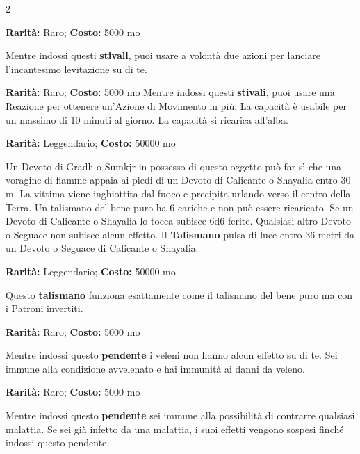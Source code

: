 \begin{multicols}{2}

\textbf{Rarità:} Raro; \textbf{Costo:} 5000 mo

Mentre indossi questi \textbf{stivali}, puoi usare a volontà due azioni per lanciare l'incantesimo levitazione su di te.


\textbf{Rarità:} Raro; \textbf{Costo:} 5000 mo
Mentre indossi questi \textbf{stivali}, puoi usare una Reazione per ottenere un'Azione di Movimento in più. La capacità è usabile per un massimo di 10 minuti al giorno. La capacità si ricarica all'alba.


\textbf{Rarità:} Leggendario; \textbf{Costo:} 50000 mo

Un Devoto di Gradh o Sumkjr in possesso di questo oggetto può far sì che una voragine di fiamme appaia ai piedi di un Devoto di Calicante o Shayalia entro 30 m. La vittima viene inghiottita dal fuoco e precipita urlando verso il centro della Terra. Un talismano del bene puro ha 6 cariche e non può essere ricaricato. Se un Devoto di Calicante o Shayalia lo tocca subisce 6d6 ferite. Qualsiasi altro Devoto o Seguace non subisce alcun effetto. Il \textbf{Talismano} pulsa di luce entro 36 metri da un Devoto o Seguace di Calicante o Shayalia.


\textbf{Rarità:} Leggendario; \textbf{Costo:} 50000 mo

Questo \textbf{talismano} funziona esattamente come il talismano del bene puro ma con i Patroni invertiti.


\textbf{Rarità:} Raro; \textbf{Costo:} 5000 mo

Mentre indossi questo \textbf{pendente} i veleni non hanno alcun effetto su di te. Sei immune alla condizione avvelenato e hai immunità ai danni da veleno.


\textbf{Rarità:} Raro; \textbf{Costo:} 5000 mo

Mentre indossi questo \textbf{pendente} sei immune alla possibilità di contrarre qualsiasi malattia. Se sei già infetto da una malattia, i suoi effetti vengono sospesi finché indossi questo pendente.



\end{multicols}
